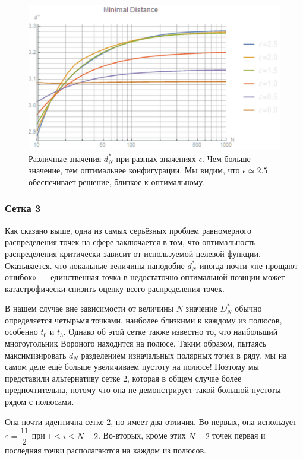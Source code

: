 \documentclass[12pt, a4paper]{article}
\begin{document}
\begin{figure}[H]
    \centering
    \includegraphics[width=\textwidth]{images/2.png}
    \caption{Различные значения $d_N^*$ при разных значениях $\epsilon$. Чем больше значение, тем оптимальнее конфигурации. Мы видим, что $\epsilon \simeq 2.5$ обеспечивает решение, близкое к оптимальному.}
\end{figure}

\subsubsection*{Сетка 3}

Как сказано выше, одна из самых серьёзных проблем равномерного распределения точек на сфере заключается в том, что оптимальность распределения критически зависит от используемой целевой функции. Оказывается. что локальные величины наподобие $d_N^*$ иногда почти «не прощают ошибок» — единственная точка в недостаточно оптимальной позиции может катастрофически снизить оценку всего распределения точек.

В нашем случае вне зависимости от величины $N$ значение $D_N^*$ обычно определяется четырьмя точками, наиболее близкими к каждому из полюсов, особенно $t_0$ и $t_3$. Однако об этой сетке также известно то, что наибольший многоугольник Вороного находится на полюсе. Таким образом, пытаясь максимизировать $d_N$ разделением изначальных полярных точек в ряду, мы на самом деле ещё больше увеличиваем пустоту на полюсе! Поэтому мы представили альтернативу сетке 2, которая в общем случае более предпочтительна, потому что она не демонстрирует такой большой пустоты рядом с полюсами.

Она почти идентична сетке 2, но имеет два отличия. Во-первых, она использует $\varepsilon = \dfrac{11}{2}$ при $1 \leq i \leq N-2$. Во-вторых, кроме этих $N-2$ точек первая и последняя точки располагаются на каждом из полюсов.
\end{document}
